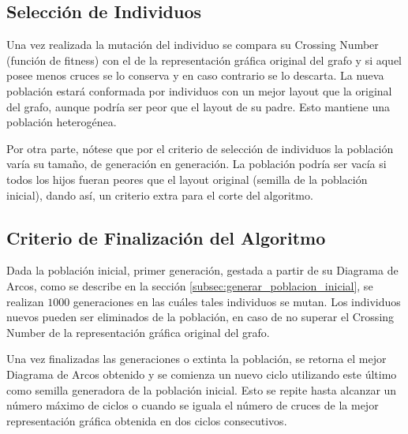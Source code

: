 	\subsection{Selección de Individuos}
	\label{subsec:seleccion_individuos}
	Una vez realizada la mutación del individuo se compara su Crossing Number (función de fitness) con el de la representación gráfica original del grafo y si aquel posee menos cruces se lo conserva y en caso contrario se lo descarta.
	La  nueva población estará conformada por  individuos con un mejor layout que la  original del  grafo, aunque podría ser peor que el layout de su padre. Esto mantiene una población heterogénea.
	
	Por otra parte, nótese que por el criterio de selección de individuos la población varía su  tamaño,  de generación en generación. La población podría ser vacía si todos los hijos fueran peores que el layout original (semilla de la  población inicial),  dando así, un criterio extra para el  corte del  algoritmo.
	
	
	
	\subsection{Criterio de Finalización del Algoritmo }
	Dada la población inicial, primer generación, gestada  a partir de su Diagrama de Arcos, como se describe  en la sección \ref{subsec:generar_poblacion_inicial}, se realizan $1000$ generaciones en las cuáles tales individuos se mutan. Los individuos nuevos pueden ser eliminados de la  población, en caso de no superar el Crossing Number de la representación gráfica original del grafo.
	
	Una vez finalizadas las generaciones o extinta la población, se retorna el mejor Diagrama de Arcos obtenido y se comienza un nuevo ciclo utilizando este último como semilla generadora de la población inicial. Esto se repite hasta alcanzar un número máximo de ciclos  o cuando se iguala el número de cruces de  la mejor representación gráfica obtenida en dos ciclos consecutivos.
	
